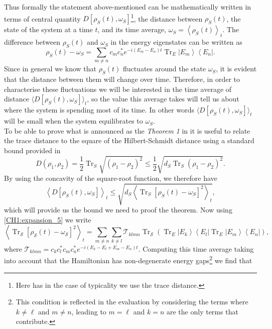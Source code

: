 \indent Thus formally the statement above-mentioned can be mathematically written in terms of central quantity $D\left[\rho_{S}(t), \omega_{S}\right]$\footnote{Here has in the case of typicality we use the trace distance.}, the distance between $\rho_S(t)$, the state of the system at a time $t$, and its time average, $\omega_{S}=\left\langle\rho_{S}(t)\right\rangle_{t}$. The difference between $\rho_S(t)$ and $\omega_{S}$ in the energy eigenstates can be written as
\begin{equation}
\rho_{S}(t)-\omega_{S}=\sum_{m \neq n} c_{m} c_{n}^{*} e^{-i\left(E_{m}-E_{n}\right) t} \operatorname{Tr}_{E}\left|E_{m}\right\rangle\left\langle E_{n}\right|.
\label{CH1:expansion_5}
\end{equation}
\indent Since in general we know that $\rho_S(t)$ fluctuates around the state $\omega_S$, it is evident that the distance between them will change over time. Therefore, in order to characterise these fluctuations we will be interested in the time average of distance $\langle D\left[\rho_{S}(t), \omega_{S}\right]\rangle_t$, so the value this average takes will tell us about where the system is spending most of its time. In other words $\langle D\left[\rho_{S}(t), \omega_{S}\right]\rangle_t$ will be small when the system equilibrates to $\omega_S$.\\

\indent To be able to prove what is announced as the \textit{Theorem 1} in \cite{linden_quantum_2009}
it is useful to relate the trace distance to the square of the Hilbert-Schmidt distance using a standard bound provided in \cite{fuchs_cryptographic_1999}
\begin{equation}
D\left(\rho_{1}, \rho_{2}\right)=\frac{1}{2} \operatorname{Tr}_{S} \sqrt{\left(\rho_{1}-\rho_{2}\right)^{2}} \leq \frac{1}{2} \sqrt{d_{S} \operatorname{Tr}_{S}\left(\rho_{1}-\rho_{2}\right)^{2}}.
\label{CH1:Linden_proof_1}
\end{equation}
By using the concavity of the square-root function, we therefore have
\begin{equation}
\left\langle D\left[\rho_{S}(t), \omega_{S}\right]\right\rangle_{t} \leq \sqrt{d_{S}\left\langle\operatorname{Tr}_{S}\left[\rho_{S}(t)-\omega_{S}\right]^{2}\right\rangle_{t}},
\label{CH1:Linden_proof_2}
\end{equation}
which will provide us the bound we need to proof the theorem. Now using \eqref{CH1:expansion_5} we write
\begin{equation}
\left\langle\operatorname{Tr}_{\mathcal{S}}\left[\rho_{\mathcal{S}}(t)-\omega_{\mathcal{S}}\right]^{2}\right\rangle_{t}=\sum_{m \neq n} \sum_{k \neq l} \mathcal{T}_{k l m n} \operatorname{Tr}_{\mathcal{S}}\left(\operatorname{Tr}_{E}\left|E_{k}\right\rangle\left\langle E_{l}\left|\operatorname{Tr}_{E}\right| E_{m}\right\rangle\left\langle E_{n}\right|\right),
\end{equation}
where $\mathcal{T}_{k l m n}=c_{k} c_{l}^{*} c_{m} c_{n}^{*} e^{-i\left(E_{k}-E_{l}+E_{m}-E_{n}\right) t}$. Computing this time average taking into account that the Hamiltonian has non-degenerate energy gaps\footnote{This condition is reflected in the evaluation by considering the terms where $k\neq\ell$ and $m\neq n$, leading to $m=\ell$ and $k=n$ are the only terms that contribute.} we find  that

